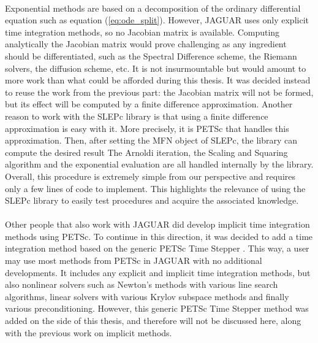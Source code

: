       \paragraph{}
      Exponential methods are based on a decomposition of the ordinary differential equation such as equation (\ref{eq:ode_split}).
      However, JAGUAR uses only explicit time integration methods, so no Jacobian matrix is available.
      Computing analytically the Jacobian matrix would prove challenging as any ingredient should be differentiated, such as the Spectral Difference scheme, the Riemann solvers, the diffusion scheme, etc.
      It is not insurmountable but would amount to more work than what could be afforded during this thesis.
      It was decided instead to reuse the work from the previous part: the Jacobian matrix will not be formed, but its effect will be computed by a finite difference approximation.
      Another reason to work with the SLEPc library is that using a finite difference approximation is easy with it.
      More precisely, it is PETSc that handles this approximation.
      Then, after setting the MFN object of SLEPc, the library can compute the desired result
      The Arnoldi iteration, the Scaling and Squaring algorithm and the exponential evaluation are all handled internally by the library.
      Overall, this procedure is extremely simple from our perspective and requires only a few lines of code to implement.
      This highlights the relevance of using the SLEPc library to easily test procedures and acquire the associated knowledge.

      \paragraph{}
      Other people that also work with JAGUAR did develop implicit time integration methods using PETSc.
      To continue in this direction, it was decided to add a time integration method based on the generic PETSc Time Stepper \cite{AbhyankarBrownConstantinescuEtAl2018}.
      This way, a user may use most methods from PETSc in JAGUAR with no additional developments.
      It includes any explicit and implicit time integration methods, but also nonlinear solvers such as Newton's methods with various line search algorithms, linear solvers with various Krylov subspace methods and finally various preconditioning.
      However, this generic PETSc Time Stepper method was added on the side of this thesis, and therefore will not be discussed here, along with the previous work on implicit methods.


